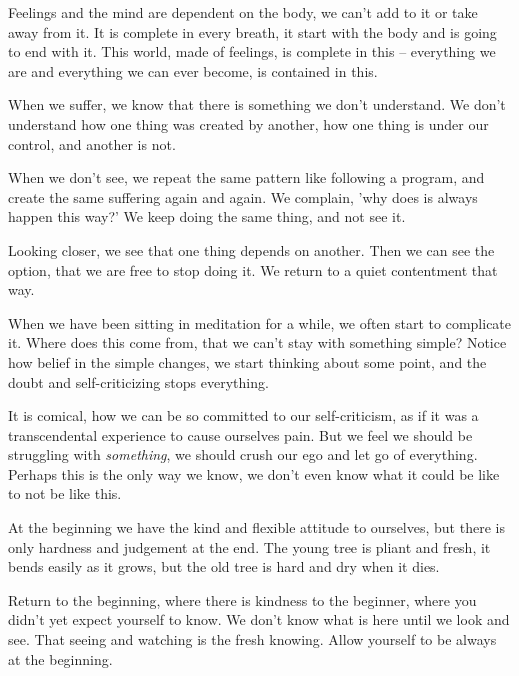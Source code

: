 Feelings and the mind are dependent on the body, we can't add to it or
take away from it. It is complete in every breath, it start with the
body and is going to end with it. This world, made of feelings, is
complete in this -- everything we are and everything we can ever become,
is contained in this.

When we suffer, we know that there is something we don't understand. We
don't understand how one thing was created by another, how one thing is
under our control, and another is not.

When we don't see, we repeat the same pattern like following a program,
and create the same suffering again and again. We complain, 'why does is
always happen this way?' We keep doing the same thing, and not see it.

Looking closer, we see that one thing depends on another. Then we can
see the option, that we are free to stop doing it. We return to a quiet
contentment that way.

When we have been sitting in meditation for a while, we often start to
complicate it. Where does this come from, that we can't stay with
something simple? Notice how belief in the simple changes, we start
thinking about some point, and the doubt and self-criticizing stops
everything.

It is comical, how we can be so committed to our self-criticism, as if
it was a transcendental experience to cause ourselves pain. But we feel
we should be struggling with \emph{something}, we should crush our ego
and let go of everything. Perhaps this is the only way we know, we don't
even know what it could be like to not be like this.

At the beginning we have the kind and flexible attitude to ourselves,
but there is only hardness and judgement at the end. The young tree is
pliant and fresh, it bends easily as it grows, but the old tree is hard
and dry when it dies.

Return to the beginning, where there is kindness to the beginner, where
you didn't yet expect yourself to know. We don't know what is here until
we look and see. That seeing and watching is the fresh knowing. Allow
yourself to be always at the beginning.
